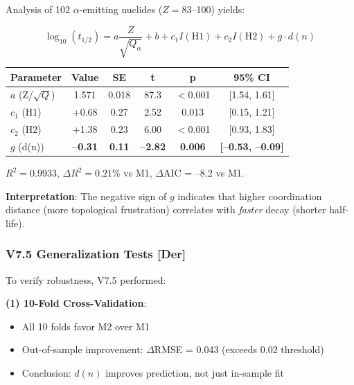 Analysis of 102 $\alpha$-emitting nuclides ($Z = 83$--100) yields:

\begin{tcolorbox}[colback=green!5!white, colframe=green!75!black, title=V7.4 Model M2: GN + Hindrance + d(n) {[Der]}]
\begin{equation}
    \log_{10}(t_{1/2}) = a \frac{Z}{\sqrt{Q_\alpha}} + b + c_1 I(\text{H1}) + c_2 I(\text{H2}) + g \cdot d(n)
\end{equation}
\begin{center}
\begin{tabular}{lccccc}
\hline
\textbf{Parameter} & \textbf{Value} & \textbf{SE} & \textbf{t} & \textbf{p} & \textbf{95\% CI} \\
\hline
$a$ (Z/$\sqrt{Q}$) & 1.571 & 0.018 & 87.3 & $<$0.001 & [1.54, 1.61] \\
$c_1$ (H1) & +0.68 & 0.27 & 2.52 & 0.013 & [0.15, 1.21] \\
$c_2$ (H2) & +1.38 & 0.23 & 6.00 & $<$0.001 & [0.93, 1.83] \\
$g$ (d(n)) & \textbf{--0.31} & \textbf{0.11} & \textbf{--2.82} & \textbf{0.006} & \textbf{[--0.53, --0.09]} \\
\hline
\end{tabular}
\end{center}
$R^2 = 0.9933$, $\Delta R^2 = 0.21\%$ vs M1, $\Delta$AIC = --8.2 vs M1.
\end{tcolorbox}

\textbf{Interpretation}: The negative sign of $g$ indicates that higher coordination distance (more topological frustration) correlates with \emph{faster} decay (shorter half-life).

\subsubsection{V7.5 Generalization Tests [Der]}
\label{subsubsec:v75-generalization}

To verify robustness, V7.5 performed:

\textbf{(1) 10-Fold Cross-Validation}:
\begin{itemize}
    \item All 10 folds favor M2 over M1
    \item Out-of-sample improvement: $\Delta$RMSE = 0.043 (exceeds 0.02 threshold)
    \item Conclusion: $d(n)$ improves prediction, not just in-sample fit
\end{itemize}


